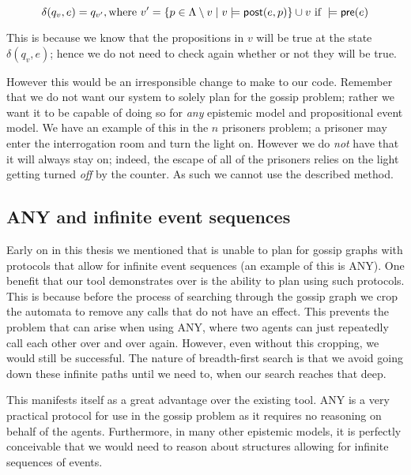 \documentclass[ %
                    author={Leo Poulson},
                supervisor={Dr. Steven Ramsay},
                    degree={BSc},
                     title={Epistemic Planning for the Dynamic Gossip problem},
                  subtitle={},
                      year={2019} ]{dissertation}
\begin{document}
\begin{equation} \label{eq:delta2}
  \delta(q_v, e) = q_{v'}, \text{where } v' = \{p \in \Lambda \setminus v \mid v \models \textsf{post}(e, p)\} \cup v
  \text{ if } 
  \models \textsf{pre}(e)
\end{equation}

This is because we know that the propositions in $v$ will be true at the state
$\delta(q_v, e)$; hence we do not need to check again whether or not they will
be true. 

However this would be an irresponsible change to make to our code. Remember that
we do not want our system to solely plan for the gossip problem; rather we want
it to be capable of doing so for \emph{any} epistemic model and propositional
event model. We have an example of this in the $n$ prisoners problem; a prisoner
may enter the interrogation room and turn the light on. However we do \emph{not}
have that it will always stay on; indeed, the escape of all of the prisoners
relies on the light getting turned \emph{off} by the counter. As such we cannot
use the described method. 

\subsection{\textsf{ANY} and infinite event sequences}

Early on in this thesis we mentioned that \cite{GithubGossip} is unable to plan
for gossip graphs with protocols that allow for infinite event sequences (an
example of this is \textsf{ANY}). One benefit that our tool demonstrates over
\cite{GithubGossip} is the ability to plan using such protocols. This is because
before the process of searching through the gossip graph we crop the automata to
remove any calls that do not have an effect. This prevents the problem that can
arise when using \textsf{ANY}, where two agents can just repeatedly call each
other over and over again. However, even without this cropping, we would still
be successful. The nature of breadth-first search is that we avoid going down
these infinite paths until we need to, when our search reaches that deep. 

This manifests itself as a great advantage over the existing tool. \textsf{ANY}
is a very practical protocol for use in the gossip problem as it requires no
reasoning on behalf of the agents. Furthermore, in many other epistemic models,
it is perfectly conceivable that we would need to reason about structures
allowing for infinite sequences of events. 
\end{document}
